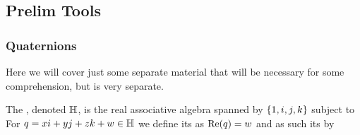 \documentclass{article}
\begin{document}
\subsection{Prelim Tools}
\subsubsection{Quaternions}
Here we will cover just some separate material that will be necessary for some comprehension, but is very separate. 

\begin{definition}
	The , denoted $\mathbb{H}$, is the real associative algebra spanned by $\left\{ 1,i,j,k \right\}$ subject to 
For $q=xi+yj+zk+w\in \mathbb{H}$ we define its  as $\operatorname{Re}(q) = w$ and as such its  by 
\end{definition}
\end{document}

